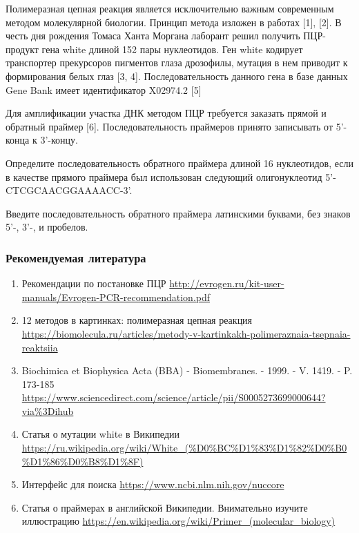 
Полимеразная цепная реакция является исключительно важным современным методом молекулярной биологии. Принцип метода изложен в работах [1], [2].
В честь дня рождения Томаса Ханта Моргана лаборант решил получить ПЦР-продукт гена white длиной 152 пары нуклеотидов. Ген white кодирует транспортер прекурсоров пигментов глаза дрозофилы, мутация в нем приводит к формирования белых глаз [3, 4]. Последовательность данного гена в базе данных Gene Bank имеет идентификатор X02974.2 [5]

Для амплификации участка ДНК методом ПЦР требуется заказать прямой и обратный праймер [6]. Последовательность праймеров принято записывать от 5'-конца к 3'-концу. 

Определите последовательность обратного праймера длиной 16 нуклеотидов, если в качестве прямого праймера был использован следующий олигонуклеотид 5'- CTCGCAACGGAAAACC-3'.

Введите последовательность обратного праймера латинскими буквами, без знаков 5'-, 3'-, и пробелов.

\subsubsection*{Рекомендуемая литература}

\begin{enumerate}
    \item Рекомендации по постановке ПЦР \url{http://evrogen.ru/kit-user-manuals/Evrogen-PCR-recommendation.pdf}
    \item 12 методов в картинках: полимеразная цепная реакция \url{https://biomolecula.ru/articles/metody-v-kartinkakh-polimeraznaia-tsepnaia-reaktsiia}
    \item Biochimica et Biophysica Acta (BBA) - Biomembranes. - 1999. - V. 1419. - P. 173-185\\ \url{https://www.sciencedirect.com/science/article/pii/S0005273699000644?via%3Dihub}
    \item Статья о мутации white в Википедии \url{https://ru.wikipedia.org/wiki/White_(%D0%BC%D1%83%D1%82%D0%B0%D1%86%D0%B8%D1%8F)}
    \item Интерфейс для поиска \url{https://www.ncbi.nlm.nih.gov/nuccore}
    \item Статья о праймерах в английской Википедии. Внимательно изучите иллюстрацию \url{https://en.wikipedia.org/wiki/Primer_(molecular_biology)}
\end{enumerate}
